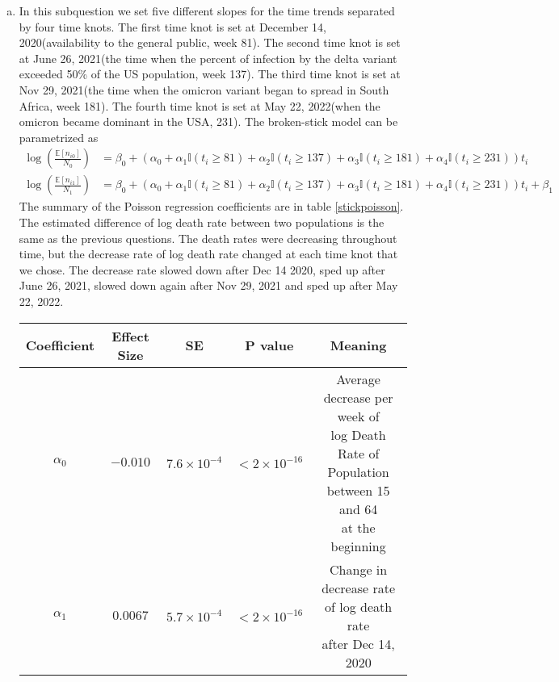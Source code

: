 \documentclass[12pt]{article}
\begin{document}
\begin{enumerate}[(a)]
	\item In this subquestion we set five different slopes for the time trends separated by four time knots. The first time knot is set at December 14, 2020(availability to the general public, week 81). The second time knot is set at June 26, 2021(the time when the percent of infection by the delta variant exceeded 50\% of the US population, week 137). The third time knot is set at Nov 29, 2021(the time when the omicron variant began to spread in South Africa, week 181). The fourth time knot is set at May 22, 2022(when the omicron became dominant in the USA, 231). The broken-stick model can be parametrized as
	 \begin{align*}
		\log(\frac{\mathbb{E}[n_{i0}]}{N_{0}}) &= \beta_{0} + \left(\alpha_{0} + \alpha_{1}\mathbb{I}(t_{i} \geq 81) + \alpha_{2}\mathbb{I}(t_{i} \geq 137) +\alpha_{3} \mathbb{I}(t_{i} \geq 181) + \alpha_{4}\mathbb{I}(t_{i} \geq 231)\right) t_{i}\\
		\log(\frac{\mathbb{E}[n_{i1}]}{N_{1}}) &= \beta_{0} + \left(\alpha_{0} + \alpha_{1}\mathbb{I}(t_{i} \geq 81) + \alpha_{2}\mathbb{I}(t_{i} \geq 137) +\alpha_{3} \mathbb{I}(t_{i} \geq 181) + \alpha_{4}\mathbb{I}(t_{i} \geq 231)\right) t_{i} + \beta_{1}
	\end{align*}
	The summary of the Poisson regression coefficients are in table \ref{stickpoisson}. The estimated difference of log death rate between two populations is the same as the previous questions. The death rates were decreasing throughout time, but the decrease rate of log death rate changed at each time knot that we chose. The decrease rate slowed down after Dec 14 2020, sped up after June 26, 2021, slowed down again after Nov 29, 2021 and sped up after May 22, 2022. 
	\begin{table}[htbp]
		\centering
		\begin{tabular}{ccccc}
			\toprule
			Coefficient & Effect Size & SE & P value & Meaning\\
			\midrule
			$\alpha_{0}$ & $-0.010$ & $7.6\times 10^{-4}$ & $<2\times 10^{-16}$ & \makecell{Average decrease per week of \\ log Death Rate of  Population \\ between 15 and 64 \\ at the beginning}\\
			\addlinespace[0.2cm]
			$\alpha_{1}$ & $0.0067$ & $5.7\times 10^{-4}$ & $<2\times 10^{-16}$& \makecell{Change in decrease rate \\ of log death rate\\ after Dec 14, 2020}\\

\end{tabular}
\end{table}
\end{enumerate}
\end{document}
